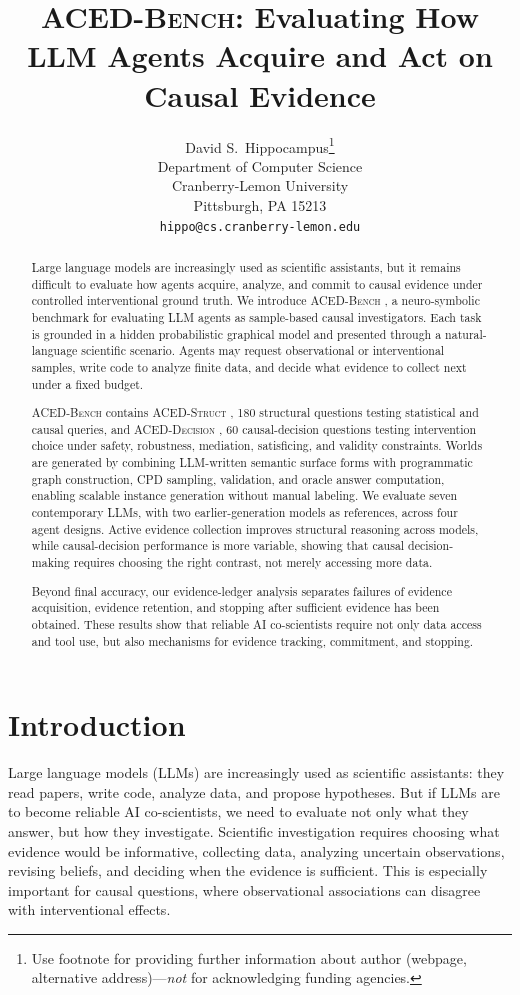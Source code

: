 \documentclass{article}
\title{\textsc{ACED-Bench}: Evaluating How LLM Agents Acquire and Act on Causal Evidence}
\author{%
  David S.~Hippocampus\thanks{Use footnote for providing further information
    about author (webpage, alternative address)---\emph{not} for acknowledging
    funding agencies.} \\
  Department of Computer Science\\
  Cranberry-Lemon University\\
  Pittsburgh, PA 15213 \\
  \texttt{hippo@cs.cranberry-lemon.edu} \\
}
\newcommand{\bench}{\textsc{ACED-Bench} }
\newcommand{\pgmstruct}{\textsc{ACED-Struct} }
\newcommand{\pgmdecision}{\textsc{ACED-Decision} }
\begin{document}
\maketitle


\begin{abstract}
Large language models are increasingly used as scientific assistants, but it remains difficult to evaluate how agents acquire, analyze, and commit to causal evidence under controlled interventional ground truth.
We introduce \bench, a neuro-symbolic benchmark for evaluating LLM agents as sample-based causal investigators.
Each task is grounded in a hidden probabilistic graphical model and presented through a natural-language scientific scenario.
Agents may request observational or interventional samples, write code to analyze finite data, and decide what evidence to collect next under a fixed budget.

\bench contains \pgmstruct, 180 structural questions testing statistical and causal queries, and \pgmdecision, 60 causal-decision questions testing intervention choice under safety, robustness, mediation, satisficing, and validity constraints. Worlds are generated by combining LLM-written semantic surface forms with programmatic graph construction, CPD sampling, validation, and oracle answer computation, enabling scalable instance generation without manual labeling. We evaluate seven contemporary LLMs, with two earlier-generation models as references, across four agent designs. Active evidence collection improves structural reasoning across models, while causal-decision performance is more variable, showing that causal decision-making requires choosing the right contrast, not merely accessing more data.

Beyond final accuracy, our evidence-ledger analysis separates failures of evidence acquisition, evidence retention, and stopping after sufficient evidence has been obtained. These results show that reliable AI co-scientists require not only data access and tool use, but also mechanisms for evidence tracking, commitment, and stopping.
\end{abstract}

\section{Introduction}
\label{sec:intro}

Large language models (LLMs) are increasingly used as scientific assistants: they read papers, write code, analyze data, and propose hypotheses.
But if LLMs are to become reliable AI co-scientists, we need to evaluate not only what they answer, but how they investigate.
Scientific investigation requires choosing what evidence would be informative, collecting data, analyzing uncertain observations, revising beliefs, and deciding when the evidence is sufficient.
This is especially important for causal questions, where observational associations can disagree with interventional effects.
\end{document}
